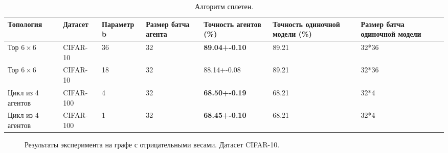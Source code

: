 \documentclass[a4paper,article,14pt]{extarticle}
\begin{document}
\begin{center}
    \begin{longtable}{|p{2.2cm}|p{1.7cm}|p{2.1cm}|p{1.6cm}|p{2.2cm}|p{2.2cm}|p{2.2cm}|}
    \caption{Алгоритм сплетен.}
    \label{table:gossip}\\
    \hline
    \textbf{Топология} & \textbf{Датасет} & \textbf{Параметр b} & \textbf{Размер батча агента} & \textbf{Точность агентов (\%)} & \textbf{Точность одиночной модели (\%)} & \textbf{Размер батча одиночной модели}\\
    \hline
    Тор $6\times 6$ & CIFAR-10 & 36 & 32 & \textbf{89.04+-0.10} & 89.21 & 32*36\\
    \hline
    Тор $6\times 6$ & CIFAR-10 & 18 & 32 & 88.14+-0.08 & 89.21 & 32*36\\
    \hline
    Цикл из 4 агентов& CIFAR-100 & 4 & 32 & \textbf{68.50+-0.19} & 68.21 & 32*4\\
    \hline
    Цикл из 4 агентов& CIFAR-100 & 1 & 32 & \textbf{68.45+-0.10} & 68.21 & 32*4\\
    \hline
    \end{longtable}
\end{center}


\begin{figure}[H]
\begin{center}
\caption{ \label{fig:negative_weights12_experiment}
     Результаты эксперимента на графе с отрицательными весами. Датасет CIFAR-10.}
\end{center}
\end{figure}
\end{document}

